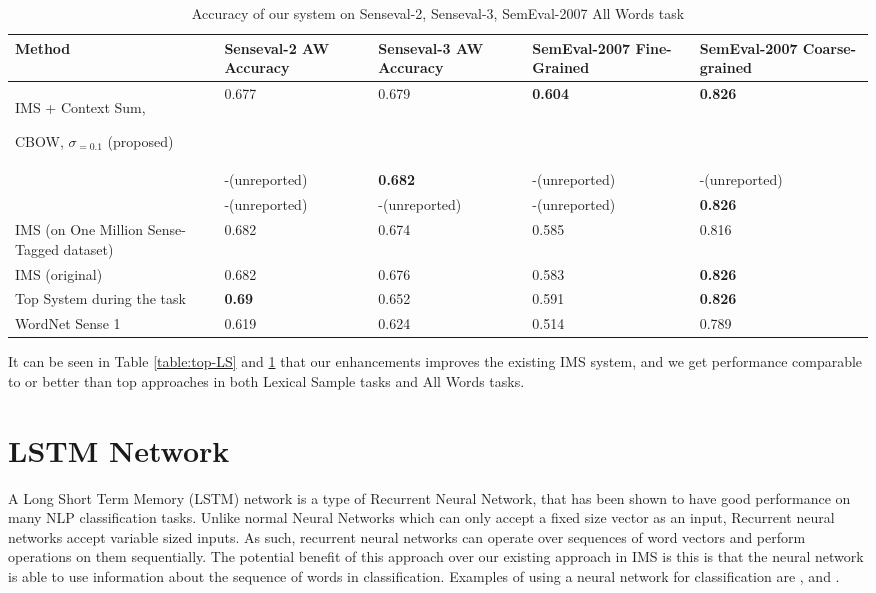 \documentclass[11pt]{article}
\begin{document}
\begin{table}
	\caption{Accuracy of our system on Senseval-2, Senseval-3, SemEval-2007 All Words task}
	\label{table:All-AW}
	\begin{center}
		\begin{tabular}{| p{4cm} | p{2cm} | p{3cm} | p{3cm} | p{3cm} | }
			\hline
			Method & Senseval-2 AW Accuracy & Senseval-3 AW Accuracy & SemEval-2007 Fine-Grained & SemEval-2007 Coarse-grained \\
			\hline
			IMS + Context Sum, 
			
			CBOW, $\sigma _{=0.1}$ (proposed) & 0.677 & 0.679 & {\bf0.604} & {\bf 0.826 } \\
			\hline
			
			\cite{Taghipour15} & -(unreported) & {\bf0.682} & -(unreported) & -(unreported) \\
			\hline
			\cite{chen2014} & -(unreported) & -(unreported) & -(unreported) & {\bf 0.826 } \\
			\hline
			IMS (on One Million Sense-Tagged dataset) & 0.682 & 0.674 & 0.585 & 0.816 \\
			\hline
			IMS (original) & 0.682 & 0.676 & 0.583 & {\bf 0.826 }  \\
			\hline
			Top System during the task & {\bf0.69} & 0.652 & 0.591 & {\bf 0.826 } \\
			\hline
			WordNet Sense 1 & 0.619 & 0.624 & 0.514 & 0.789\\
			\hline
		\end{tabular}
	\end{center}
\end{table}


It can be seen in Table \ref{table:top-LS} and \ref{table:All-AW} that our enhancements improves the existing IMS system, and we get performance comparable to or better than top approaches in both Lexical Sample tasks and All Words tasks. 

\section{LSTM Network}

A Long Short Term Memory (LSTM) network is a type of Recurrent Neural Network, that has been shown to have good performance on many NLP classification tasks. Unlike normal Neural Networks which can only accept a fixed size vector as an input, Recurrent neural networks accept variable sized inputs. As such, recurrent neural networks can operate over sequences of word vectors and perform operations on them sequentially. The potential benefit of this approach over our existing approach in IMS is this is that the neural network is able to use information about the sequence of words in classification. Examples of using a neural network for classification are \cite{socher2011parsing}, and \cite{socher2013recursive}. 
\end{document}
